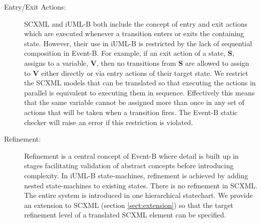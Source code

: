 \begin{description}
\item [Entry/Exit Actions:]
SCXML and iUML-B both include the concept of entry and exit actions which are executed whenever a transition enters or exits the containing state. 
However, their use in iUML-B is restricted by the lack of sequential composition in Event-B. 
For example, if an exit action of a state, \textbf{S}, assigns to a variable, \textbf{V}, then no transitions from \textbf{S} are allowed to assign to \textbf{V} either directly or via entry actions of their target state.
We restrict the SCXML models that can be translated so that executing the actions in parallel is equivalent to executing them in sequence.
Effectively this means that the same variable cannot be assigned more than once in any set of actions that will be taken when a transition fires. 
The Event-B static checker will raise an error if this restriction is violated.


\item [Refinement:]
Refinement is a central concept of Event-B where detail is built up in stages facilitating validation of abstract concepts before introducing complexity. 
In iUML-B state-machines, refinement is achieved by adding nested state-machines to existing states.
There is no refinement in SCXML. The entire system is introduced in one hierarchical statechart. We provide an extension to SCXML (section \ref{sect:extension}) so that the target refinement level of a translated SCXML element can be specified.

\end{description}


%
%


